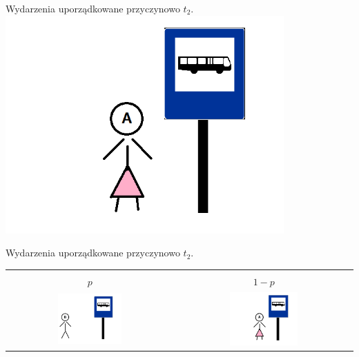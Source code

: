 \documentclass{beamer}
\begin{document}
\begin{frame}{Wydarzenia uporządkowane przyczynowo $t_2$.}
\centering
\includegraphics[width=0.8\textwidth]{obrazki/pA}
\end{frame}

\begin{frame}{Wydarzenia uporządkowane przyczynowo $t_2$.}
\centering
\begin{tabular}{|c|c|}
\hline\\
$p$ & $1-p$ \\
\hline
\includegraphics[width=0.4\textwidth]{obrazki/pB} & \includegraphics[width=0.4\textwidth]{obrazki/pA}\\
\hline
\end{tabular}
\end{frame}
\end{document}
